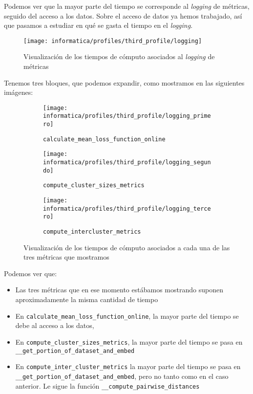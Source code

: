 Podemos ver que la mayor parte del tiempo se corresponde al \textit{logging} de métricas, seguido del acceso a los datos. Sobre el acceso de datos ya hemos trabajado, así que pasamos a estudiar en qué se gasta el tiempo en el \textit{logging}.


\begin{figure}[H]
    \centering
    \texttt{[image: informatica/profiles/third\_profile/logging]}
    \caption{Visualización de los tiempos de cómputo asociados al \textit{logging} de métricas}
\end{figure}

Tenemos tres bloques, que podemos expandir, como mostramos en las siguientes imágenes:

\begin{figure}[H]
\centering
    \begin{subfigure}{.5\textwidth}
        \centering
        \texttt{[image: informatica/profiles/third\_profile/logging\_primero]}
        \caption{\lstinline{calculate_mean_loss_function_online}}
    \end{subfigure}%
    \begin{subfigure}{.5\textwidth}
        \centering
        \texttt{[image: informatica/profiles/third\_profile/logging\_segundo]}
        \caption{\lstinline{compute_cluster_sizes_metrics}}
    \end{subfigure}

    \begin{subfigure}{.7\textwidth}
        \centering
        \texttt{[image: informatica/profiles/third\_profile/logging\_tercero]}
        \caption{\lstinline{compute_intercluster_metrics}}
    \end{subfigure}
\caption{Visualización de los tiempos de cómputo asociados a cada una de las tres métricas que mostramos}
\end{figure}

Podemos ver que:

\begin{itemize}
    \item Las tres métricas que en ese momento estábamos mostrando suponen aproximadamente la misma cantidad de tiempo
    \item En \lstinline{calculate_mean_loss_function_online}, la mayor parte del tiempo se debe al acceso a los datos,
    \item En \lstinline{compute_cluster_sizes_metrics}, la mayor parte del tiempo se pasa en \lstinline{__get_portion_of_dataset_and_embed}
    \item En \lstinline{compute_inter_cluster_metrics} la mayor parte del tiempo se pasa en \lstinline{__get_portion_of_dataset_and_embed}, pero no tanto como en el caso anterior. Le sigue la función \lstinline{__compute_pairwise_distances}
\end{itemize}

